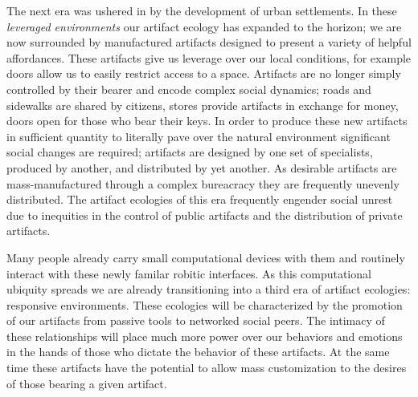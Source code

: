 The next era was ushered in by the development of urban settlements. 
In these \emph{leveraged environments} our artifact ecology has expanded to the horizon; we are now surrounded by manufactured artifacts designed to present a variety of helpful affordances.
These artifacts give us leverage over our local conditions, for example doors allow us to easily restrict access to a space.
Artifacts are no longer simply controlled by their bearer and encode complex social dynamics; roads and sidewalks are shared by citizens, stores provide artifacts in exchange for money, doors open for those who bear their keys.
In order to produce these new artifacts in sufficient quantity to literally pave over the natural environment significant social changes are required; artifacts are designed by one set of specialists, produced by another, and distributed by yet another.
As desirable artifacts are mass-manufactured through a complex bureacracy they are frequently unevenly distributed.
The artifact ecologies of this era frequently engender social unrest due to inequities in the control of public artifacts and the distribution of private artifacts.

Many people already carry small computational devices with them and routinely interact with these newly familar robitic interfaces. As this computational ubiquity spreads we are already transitioning into a third era of artifact ecologies: responsive environments. These ecologies will be characterized by the promotion of our artifacts from passive tools to networked social peers. The intimacy of these relationships will place much more power over our behaviors and emotions in the hands of those who dictate the behavior of these artifacts. At the same time these artifacts have the potential to allow mass customization to the desires of those bearing a given artifact. 

